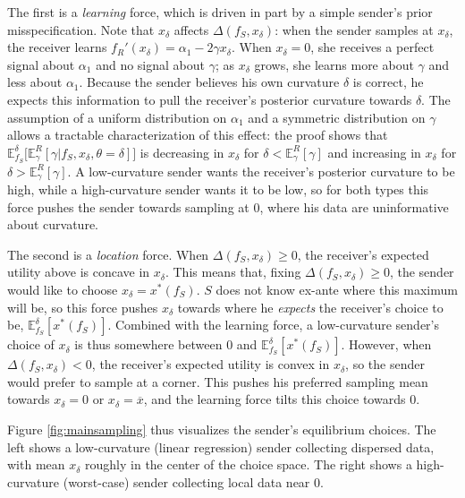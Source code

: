 \documentclass[11pt,dvipsnames]{article}
\begin{document}
The first is a \emph{learning} force, which is driven in part by a simple sender's prior misspecification.
Note that $x_\delta$ affects $\Delta(f_S,x_\delta)$: when the sender samples at $x_\delta$, the receiver learns $f_R'(x_\delta) = \alpha_1 - 2\gamma x_\delta$.
When $x_\delta=0$, she receives a perfect signal about $\alpha_1$ and no signal about $\gamma$; as $x_\delta$ grows, she learns more about $\gamma$ and less about $\alpha_1$.
Because the sender believes his own curvature $\delta$ is correct, he expects this information to pull the receiver's posterior curvature towards $\delta$.
The assumption of a uniform distribution on $\alpha_1$ and a symmetric distribution on $\gamma$ allows a tractable characterization of this effect: the proof shows that $\mathbb{E}_{f_S}^\delta\big[\mathbb{E}_\gamma^R[\gamma|f_S,x_\delta,\theta=\delta]\big]$ is decreasing in $x_\delta$ for $\delta < \mathbb{E}_\gamma^R[\gamma]$ and increasing in $x_\delta$ for $\delta > \mathbb{E}_\gamma^R[\gamma]$.
A low-curvature sender wants the receiver's posterior curvature to be high, while a high-curvature sender wants it to be low, so for both types this force pushes the sender towards sampling at $0$, where his data are uninformative about curvature.

The second is a \emph{location} force.
When $\Delta(f_S,x_\delta)\geq 0$, the receiver's expected utility above is concave in $x_\delta$.
This means that, fixing $\Delta(f_S,x_\delta) \geq 0$, the sender would like to choose $x_\delta = x^*(f_S)$.
$S$ does not know ex-ante where this maximum will be, so this force pushes $x_\delta$ towards where he \emph{expects} the receiver's choice to be, $\mathbb{E}_{f_S}^\delta[x^*(f_S)]$.
Combined with the learning force, a low-curvature sender's choice of $x_\delta$ is thus somewhere between $0$ and $\mathbb{E}_{f_S}^\delta[x^*(f_S)]$.
However, when $\Delta(f_S,x_\delta) < 0$, the receiver's expected utility is convex in $x_\delta$, so the sender would prefer to sample at a corner.
This pushes his preferred sampling mean towards $x_\delta = 0$ or $x_\delta = \overline{x}$, and the learning force tilts this choice towards $0$.

Figure \ref{fig:mainsampling} thus visualizes the sender's equilibrium choices.
The left shows a low-curvature (linear regression) sender collecting dispersed data, with mean $x_\delta$ roughly in the center of the choice space.
The right shows a high-curvature (worst-case) sender collecting local data near $0$.
\end{document}
